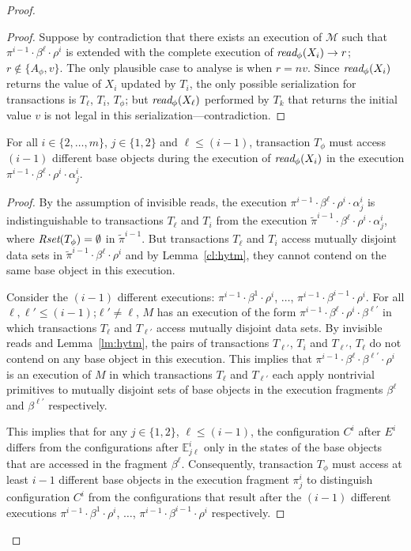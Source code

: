 \begin{proof}
\begin{proof}
Suppose by contradiction that there exists an execution of $\mathcal{M}$ such that
$\pi^{i-1}\cdot\beta^{\ell}\cdot \rho^i$ is extended with the complete execution
of $\textit{read}_{\phi}(X_i) \rightarrow r$; $r \not\in \{A_{\phi},v\}$. 
The only plausible case to analyse is when $r=nv$.
Since $\textit{read}_{\phi}(X_i)$ returns the value of $X_i$ updated by $T_i$, 
the only possible serialization for transactions is $T_{\ell}$, $T_i$, $T_{\phi}$; but $\textit{read}_{\phi}(X_{\ell})$
performed by $T_k$ that returns the initial value $v$
is not legal in this serialization---contradiction.
\end{proof}
%
\begin{claim}
\label{cl:three}
For all $i\in \{2,\ldots, m\}$, $j\in \{1,2\}$ and $\ell \leq (i-1)$, transaction $T_{\phi}$ must access
$(i-1)$ different base objects during the execution of $\textit{read}_{\phi}(X_i)$ in the execution
$\pi^{i-1}\cdot \beta^{\ell}\cdot \rho^i \cdot \alpha_j^i$.
\end{claim}
%
\begin{proof}
By the assumption of invisible reads,
the execution $\pi^{i-1}\cdot \beta^{\ell}\cdot \rho^i \cdot \alpha_j^i$
is indistinguishable to
transactions $T_{\ell}$ and $T_{i}$
from the execution ${\tilde \pi}^{i-1}\cdot \beta^{\ell}\cdot \rho^i \cdot \alpha_j^i$, where $\textit{Rset}(T_{\phi})=\emptyset$
in ${\tilde \pi}^{i-1}$.
But transactions $T_{\ell}$ and $T_{i}$ access mutually disjoint data sets in ${\tilde \pi}^{i-1}\cdot \beta^{\ell}\cdot \rho^i$ and by Lemma~\ref{cl:hytm},
they cannot contend on the same base object in this execution.

Consider the $(i-1)$ different executions: 
$\pi^{i-1}\cdot\beta^{1}\cdot \rho^i$, $\ldots$, $\pi^{i-1}\cdot\beta^{i-1}\cdot \rho^i$.
For all $\ell, \ell' \leq (i-1)$;$\ell' \neq \ell$, 
$M$ has an execution of the form $\pi^{i-1}\cdot \beta^{\ell}\cdot \rho^i \cdot \beta^{\ell'}$
in which transactions $T_{\ell}$ and $T_{\ell'}$ access mutually disjoint data sets.
By invisible reads and Lemma~\ref{lm:hytm}, the pairs of transactions $T_{\ell'}$, $T_{i}$ and $T_{\ell'}$, $T_{\ell}$
do not contend on any base object in this execution.
This implies that $\pi^{i-1}\cdot \beta^{\ell} \cdot \beta^{\ell'} \cdot \rho^i$ is an execution of $M$ in which
transactions $T_{\ell}$ and $T_{\ell'}$ each apply nontrivial primitives
to mutually disjoint sets of base objects in the execution fragments $\beta^{\ell}$ and $\beta^{\ell'}$ respectively.

This implies that for any $j\in \{1,2\}$, $\ell \leq (i-1)$, the configuration $C^i$ after $E^i$ differs from the configurations
after $\mathbb{E}_{j\ell}^{i}$ only in the states of the base objects that are accessed in the fragment $\beta^{\ell}$.
Consequently, transaction $T_{\phi}$ must access at least $i-1$ different base objects
in the execution fragment $\pi_j^i$
to distinguish configuration $C^i$ from the configurations
that result after the $(i-1)$ different executions 
$\pi^{i-1}\cdot\beta^{1}\cdot \rho^i$, $\ldots$, $\pi^{i-1}\cdot\beta^{i-1}\cdot \rho^i$ respectively.


\end{proof}
\end{proof}
